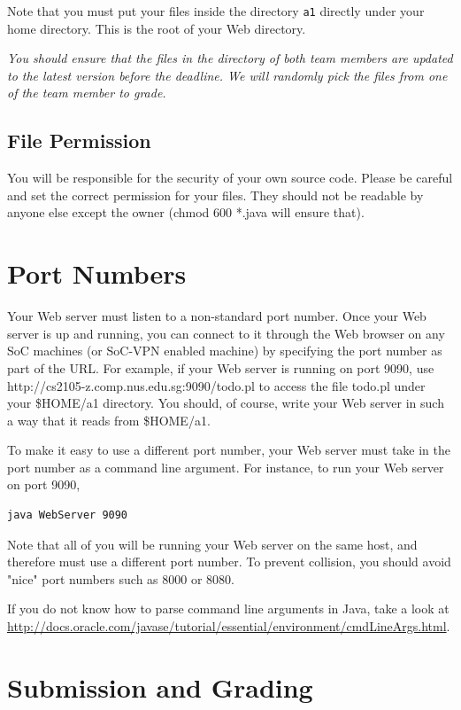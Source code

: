 \documentclass[a4paper,11pt]{exam}
\begin{document}
Note that you must put your files inside the directory \texttt{a1} directly under your home directory. This is the root of your Web directory.

\textit{You should ensure that the files in the directory of both team members are updated to the latest version before the deadline.  We will randomly pick the files from one of the team member to grade.}

\subsection*{File Permission}

You will be responsible for the security of your own source code. Please be careful and set the correct permission for your files. They should not be readable by anyone else except the owner (chmod 600 *.java will ensure that).

\section*{Port Numbers}

Your Web server must listen to a non-standard port number. Once your Web server is up and running, you can connect to it through the Web browser on any SoC machines (or SoC-VPN enabled machine) by specifying the port number as part of the URL. For example, if your Web server is running on port 9090, use http://cs2105-z.comp.nus.edu.sg:9090/todo.pl to access the file todo.pl under your \$HOME/a1 directory. You should, of course, write your Web server in such a way that it reads from \$HOME/a1.

To make it easy to use a different port number, your Web server must take in the port number as a command line argument. For instance, to run your Web server on port 9090,

\begin{verbatim}
java WebServer 9090
\end{verbatim}

Note that all of you will be running your Web server on the same host, and therefore must use a different port number. To prevent collision, you should avoid "nice" port numbers such as 8000 or 8080.

If you do not know how to parse command line arguments in Java, take a look at \url{http://docs.oracle.com/javase/tutorial/essential/environment/cmdLineArgs.html}.

\section*{Submission and Grading}
\end{document}
